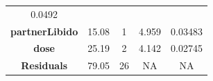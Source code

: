 \documentclass[]{article}
\begin{document}
\begin{longtable}[]{@{}ccccc@{}}
\begin{minipage}[t]{0.12\columnwidth}
0.0492\strut
\end{minipage}\tabularnewline
\begin{minipage}[t]{0.24\columnwidth}\centering\strut
\textbf{partnerLibido}\strut
\end{minipage} & \begin{minipage}[t]{0.11\columnwidth}\centering\strut
15.08\strut
\end{minipage} & \begin{minipage}[t]{0.06\columnwidth}\centering\strut
1\strut
\end{minipage} & \begin{minipage}[t]{0.12\columnwidth}\centering\strut
4.959\strut
\end{minipage} & \begin{minipage}[t]{0.12\columnwidth}\centering\strut
0.03483\strut
\end{minipage}\tabularnewline
\begin{minipage}[t]{0.24\columnwidth}\centering\strut
\textbf{dose}\strut
\end{minipage} & \begin{minipage}[t]{0.11\columnwidth}\centering\strut
25.19\strut
\end{minipage} & \begin{minipage}[t]{0.06\columnwidth}\centering\strut
2\strut
\end{minipage} & \begin{minipage}[t]{0.12\columnwidth}\centering\strut
4.142\strut
\end{minipage} & \begin{minipage}[t]{0.12\columnwidth}\centering\strut
0.02745\strut
\end{minipage}\tabularnewline
\begin{minipage}[t]{0.24\columnwidth}\centering\strut
\textbf{Residuals}\strut
\end{minipage} & \begin{minipage}[t]{0.11\columnwidth}\centering\strut
79.05\strut
\end{minipage} & \begin{minipage}[t]{0.06\columnwidth}\centering\strut
26\strut
\end{minipage} & \begin{minipage}[t]{0.12\columnwidth}\centering\strut
NA\strut
\end{minipage} & \begin{minipage}[t]{0.12\columnwidth}\centering\strut
NA\strut
\end{minipage}\tabularnewline
\bottomrule
\end{longtable}
\end{document}
